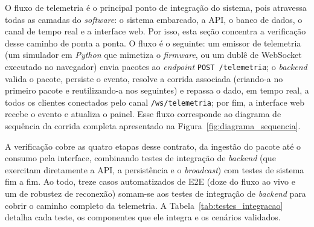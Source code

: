 O fluxo de telemetria é o principal ponto de integração do sistema, pois atravessa
todas as camadas do \textit{software}: o sistema embarcado, a API, o banco de dados, o
canal de tempo real e a interface web. Por isso, esta seção concentra a verificação
desse caminho de ponta a ponta. O fluxo é o seguinte: um emissor de telemetria (um
simulador em \textit{Python} que mimetiza o \textit{firmware}, ou um dublê de WebSocket
executado no navegador) envia pacotes ao \textit{endpoint} \texttt{POST /telemetria}; o
\textit{backend} valida o pacote, persiste o evento, resolve a corrida associada
(criando-a no primeiro pacote e reutilizando-a nos seguintes) e repassa o dado, em
tempo real, a todos os clientes conectados pelo canal \texttt{/ws/telemetria}; por fim,
a interface web recebe o evento e atualiza o painel. Esse fluxo corresponde ao diagrama
de sequência da corrida completa apresentado na Figura~\ref{fig:diagrama_sequencia}.

A verificação cobre as quatro etapas desse contrato, da ingestão do pacote até o
consumo pela interface, combinando testes de integração de \textit{backend} (que
exercitam diretamente a API, a persistência e o \textit{broadcast}) com testes de
sistema fim a fim. Ao todo, treze casos automatizados de E2E (doze do fluxo ao vivo e um
de robustez de reconexão) somam-se aos testes de integração de \textit{backend} para
cobrir o caminho completo da telemetria. A Tabela~\ref{tab:testes_integracao} detalha
cada teste, os componentes que ele integra e os cenários validados.

